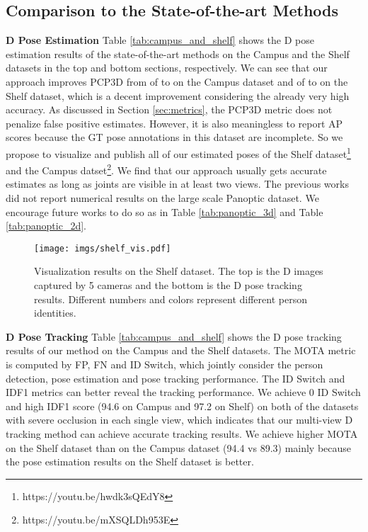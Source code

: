 \subsection{Comparison to the State-of-the-art Methods}
\textbf{D Pose Estimation } Table \ref{tab:campus_and_shelf} shows the D pose estimation results of the state-of-the-art methods on the Campus and the Shelf datasets in the top and bottom sections, respectively. We can see that our approach improves PCP3D from  of \cite{chen2020cross} to  on the Campus dataset and  of \cite{dong2019fast} to  on the Shelf dataset, which is a decent improvement considering the already very high accuracy. As discussed in Section \ref{sec:metrics}, the PCP3D metric does not penalize false positive estimates. However, it is also meaningless to report AP scores because the GT pose annotations in this dataset are incomplete. So we propose to visualize and publish all of our estimated poses of the Shelf dataset\footnote{https://youtu.be/hwdk3sQEdY8} and the Campus datset\footnote{https://youtu.be/mXSQLDh953E}. We find that our approach usually gets accurate estimates as long as joints are visible in at least two views. The previous works \cite{belagiannis20143d,belagiannis20153d,belagiannis2014multiple,dong2019fast,chen2020cross} did not report numerical results on the large scale Panoptic dataset. We encourage future works to do so as in Table \ref{tab:panoptic_3d} and Table \ref{tab:panoptic_2d}. 


\begin{figure*}
	\centering
	\texttt{[image: imgs/shelf\_vis.pdf]}
	\caption{Visualization results on the Shelf dataset. The top is the D images captured by 5 cameras and the bottom is the D pose tracking results. Different numbers and colors represent different person identities. 
	}
	\label{fig:shelf}
\end{figure*}


\vspace{1em}
\noindent
\textbf{D Pose Tracking } Table \ref{tab:campus_and_shelf} shows the D pose tracking results of our method on the Campus and the Shelf datasets. The MOTA metric is computed by FP, FN and ID Switch, which jointly consider the person detection, pose estimation and pose tracking performance. The ID Switch and IDF1 metrics can better reveal the tracking performance. We achieve 0 ID Switch and high IDF1 score (94.6 on Campus and 97.2 on Shelf) on both of the datasets with severe occlusion in each single view, which indicates that our multi-view D tracking method can achieve accurate tracking results. We achieve higher MOTA on the Shelf dataset than on the Campus dataset (94.4 vs 89.3) mainly because the pose estimation results on the Shelf dataset is better. 


